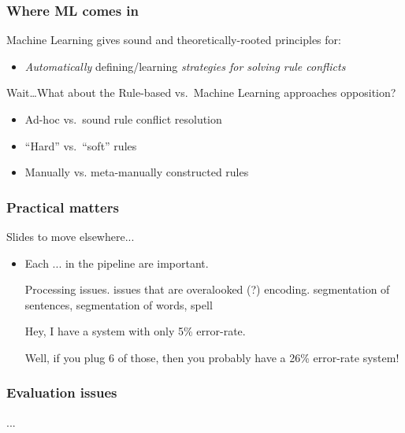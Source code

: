 \documentclass[usenames,dvipsnames]{beamer}
\newcommand{\voc}[1]{\emph{\color{ForestGreen}#1}}
\begin{document}
\begin{frame}\frametitle{Where ML comes in}

\begin{block}{Machine Learning gives sound and theoretically-rooted principles for:}
\begin{itemize}
\item \emph{Automatically} defining/learning \voc{strategies for solving rule conflicts}
\end{itemize}
\end{block}

Wait\dots What about the Rule-based vs.\ Machine Learning approaches opposition?

\pause
\begin{itemize}
\item Ad-hoc vs.\ sound rule conflict resolution
\item ``Hard'' vs.\ ``soft'' rules
\item Manually vs. meta-manually constructed rules
\end{itemize}

\end{frame}


\begin{frame}\frametitle{Practical matters}
Slides to move elsewhere...
\begin{itemize}
\item Each ... in the pipeline are important.

Processing issues. issues that are overalooked (?) encoding.  segmentation of sentences, segmentation of words, spell

Hey, I have a system with only 5\% error-rate.

Well, if you plug 6 of those, then you probably have a 26\% error-rate system!
\end{itemize}

\end{frame}

\begin{frame}\frametitle{Evaluation issues}
...
\end{frame}
\end{document}
